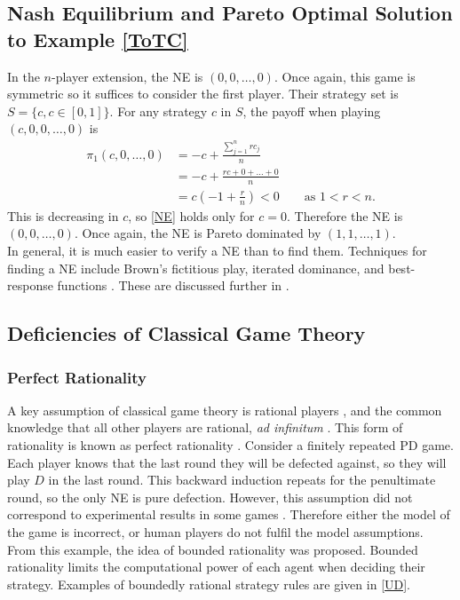 \subsection{Nash Equilibrium and Pareto Optimal Solution to Example \ref{ToTC}}

In the $n$-player extension, the NE is $(0,0,\dots,0)$. Once again, this game is symmetric so it suffices to consider the first player. Their strategy set is $S = \{c, c \in [0,1] \}$. For any strategy $c$ in $S$, the payoff when playing $(c,0,0,\dots,0)$ is \\
\begin{align*}
    \pi_1(c,0,\dots,0) &= -c + \frac{\sum_{j=1}^n rc_j}{n} \\
    &= -c + \frac{rc + 0 + \dots + 0}{n} \\
    &= c\left(-1+\frac{r}{n}\right)<0 \qquad \text{as $1<r<n$.}
\end{align*}
This is decreasing in $c$, so \eqref{NE} holds only for $c=0$. Therefore the NE is $(0,0,\dots,0)$. Once again, the NE is Pareto dominated by $(1,1,\dots,1)$. \\

In general, it is much easier to verify a NE than to find them. Techniques for finding a NE include Brown's fictitious play, iterated dominance, and best-response functions \cite{RN99}. These are discussed further in \cite{RN99}. 
\subsection{Deficiencies of Classical Game Theory} \label{Differences}
 \subsubsection{Perfect Rationality}
A key assumption of classical game theory is rational players , and the common knowledge that all other players are rational, \emph{ad infinitum} \cite{RN78}. This form of rationality is known as perfect rationality \cite{RN99}. Consider a finitely repeated PD game. Each player knows that the last round they will be defected against, so they will play $D$ in the last round. This backward induction repeats for the penultimate round, so the only NE is pure defection. However, this assumption did not correspond to experimental results in some games \cite{RN99, RN50}. Therefore either the model of the game is incorrect, or human players do not fulfil the model assumptions. From this example, the idea of bounded rationality was proposed. Bounded rationality limits the computational power of each agent when deciding their strategy. Examples of boundedly rational strategy rules are given in \ref{UD}.   \\

